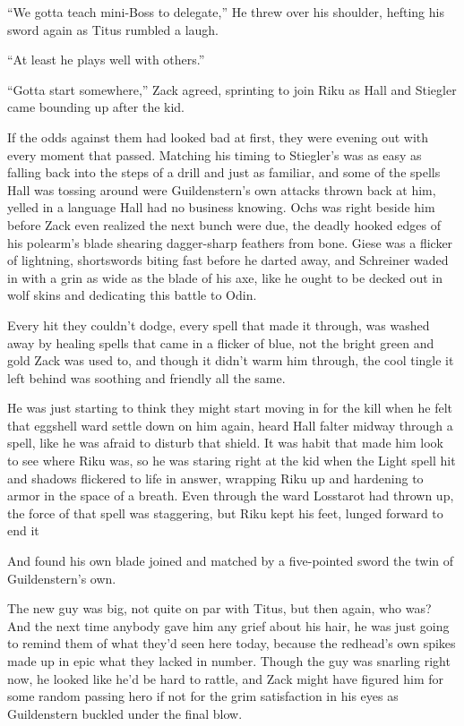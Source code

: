 ``We gotta teach mini-Boss to delegate,'' He threw over his shoulder, hefting his sword again as Titus rumbled a laugh.

``At least he plays well with others.''

``Gotta start somewhere,'' Zack agreed, sprinting to join Riku as Hall and Stiegler came bounding up after the kid.

If the odds against them had looked bad at first, they were evening out with every moment that passed. Matching his timing to Stiegler's was as easy as falling back into the steps of a drill and just as familiar, and some of the spells Hall was tossing around were Guildenstern's own attacks thrown back at him, yelled in a language Hall had no business knowing. Ochs was right beside him before Zack even realized the next bunch were due, the deadly hooked edges of his polearm's blade shearing dagger-sharp feathers from bone. Giese was a flicker of lightning, shortswords biting fast before he darted away, and Schreiner waded in with a grin as wide as the blade of his axe, like he ought to be decked out in wolf skins and dedicating this battle to Odin.

Every hit they couldn't dodge, every spell that made it through, was washed away by healing spells that came in a flicker of blue, not the bright green and gold Zack was used to, and though it didn't warm him through, the cool tingle it left behind was soothing and friendly all the same.

He was just starting to think they might start moving in for the kill when he felt that eggshell ward settle down on him again, heard Hall falter midway through a spell, like he was afraid to disturb that shield. It was habit that made him look to see where Riku was, so he was staring right at the kid when the Light spell hit and shadows flickered to life in answer, wrapping Riku up and hardening to armor in the space of a breath. Even through the ward Losstarot had thrown up, the force of that spell was staggering, but Riku kept his feet, lunged forward to end it\textemdash 

And found his own blade joined and matched by a five-pointed sword the twin of Guildenstern's own.

The new guy was big, not quite on par with Titus, but then again, who was? And the next time anybody gave him any grief about his hair, he was just going to remind them of what they'd seen here today, because the redhead's own spikes made up in epic what they lacked in number. Though the guy was snarling right now, he looked like he'd be hard to rattle, and Zack might have figured him for some random passing hero if not for the grim satisfaction in his eyes as Guildenstern buckled under the final blow.

